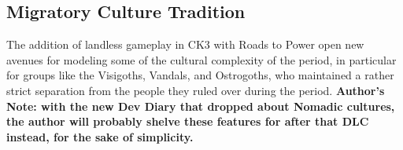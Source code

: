 \documentclass{article}
\begin{document}
\begin{comment}
		Dinglings - 1st Century BC - tied to Korkal culture?
		Korkel culture - to the east of the Gajou Turks/Tiele?
		
		\begin{figure}[h!]
			\centering
			\texttt{[image: ./images/steppe\_cultures\_-100.png]}
			\caption{Steppe Culture Map, 100 BC}
		\end{figure}
		
		\paragraph{AD 100}
		The Xiongnu, after being forced into tributary status, were split over succession into the Northern and Southern Xiongnu states; initially, the Northen Xiongnu state was centered on Orkhon and influencing the Tarim Basin, but was forced to migrate in the face of Han, Southern Xiongnu, and will migrate to Yeuban (i.e., Zhetysu) in the early IInd Century, while another group fled towards Kangju and Transoxiana.
		
		Within the old core of Xiongnu territory, the Xianbei rise as the premier steppe confederation between the Ist and IIIrd Centuries, displacing the Xiongnu in their old core and probably playing a roll in Turkifying the Tashtyk into the Yenisei Kygryz and the advent of the Dingling/Tiele/Gaoche (almost certainly the progenitors of later Oghuz groups).
		
		For the next few hundred years, the Saka regions of the Steppe will see varying admixtures, with the proto-Hunas, beyond the influence of the Xianbei.
		The author suspects that division played a role in the final Oghur/Oghuz split in Turkic and for whatever historical reasons, the proto-Hunas displaced the Saka culturally in the region between the Sarmatian and Zheytsu.
		
		\begin{figure}[h!]
			\centering
			\texttt{[image: ./images/steppe\_cultures\_100.png]}
			\caption{Steppe Culture Map, 100 BC}
		\end{figure}
		
		\paragraph{AD 300}
	\end{comment}
	
	\subsection{Migratory Culture Tradition}
	\label{sec:culture_review:subsec:migratory_cultures}
	The addition of landless gameplay in CK3 with Roads to Power open new avenues for modeling some of the cultural complexity of the period, in particular for groups like the Visigoths, Vandals, and Ostrogoths, who maintained a rather strict separation from the people they ruled over during the period.
	\textbf{Author's Note: with the new Dev Diary that dropped about Nomadic cultures, the author will probably shelve these features for after that DLC instead, for the sake of simplicity.}
	
\end{document}
